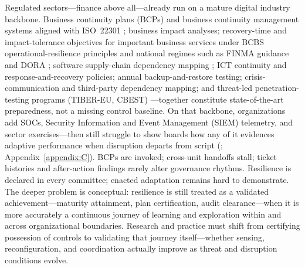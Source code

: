 Regulated sectors---finance above all---already run on a mature digital industry backbone. Business continuity plans (BCPs) and business continuity management systems aligned with ISO~22301 \autocite{calder2021iso}; business impact analyses; recovery-time and impact-tolerance objectives for important business services under BCBS operational-resilience principles and national regimes such as FINMA guidance and DORA \autocite{bcbs2021operational,european2022regulation,finma2023operational}; software supply-chain dependency mapping \autocite{shen2024understanding}; ICT continuity and response-and-recovery policies; annual backup-and-restore testing; crisis-communication and third-party dependency mapping; and threat-led penetration-testing programs (TIBER-EU, CBEST) \autocite{ecb2018tiber,boe2021cbest}---together constitute state-of-the-art preparedness, not a missing control baseline. On that backbone, organizations add SOCs, Security Information and Event Management (SIEM) telemetry, and sector exercises---then still struggle to show boards how any of it evidences adaptive performance when disruption departs from script (\autocite{rota2024}; Appendix~\ref{appendix:C}). BCPs are invoked; cross-unit handoffs stall; ticket histories and after-action findings rarely alter governance rhythms. Resilience is declared in every committee; enacted adaptation remains hard to demonstrate. The deeper problem is conceptual: resilience is still treated as a validated achievement---maturity attainment, plan certification, audit clearance---when it is more accurately a continuous journey of learning and exploration within and across organizational boundaries. Research and practice must shift from certifying possession of controls to validating that journey itself---whether sensing, reconfiguration, and coordination actually improve as threat and disruption conditions evolve.\\
\\
